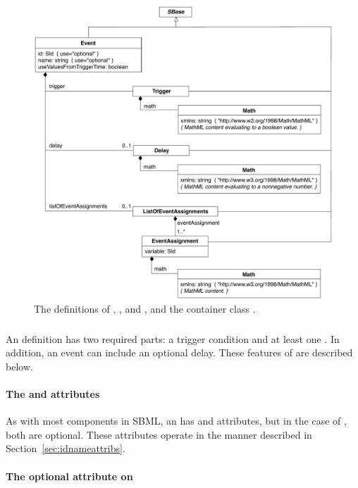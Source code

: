 \begin{figure}[htb]
  \centering
  \small
  \includegraphics[scale=0.8]{figs/event-uml}
  \caption{The definitions of \Event, \Trigger, \Delay
      and \EventAssignment, and the container class
      \ListOfEventAssignments.}
  \label{fig:event}
\end{figure}


\subsubsection{}

An \Event definition has two required parts: a
trigger condition and at least one \EventAssignment.  In
  addition, an event can include an optional delay.  These features
  of \Event are described below.

\paragraph{The  and  attributes}
\label{sec:event-id-name}

As with most components in SBML, an \Event has  and
 attributes, but in the case of \Event, both are optional.
These attributes operate in the manner described in
Section~\ref{sec:idnameattribs}.


\paragraph{The optional  attribute on }
\label{sec:event-sboterm}


